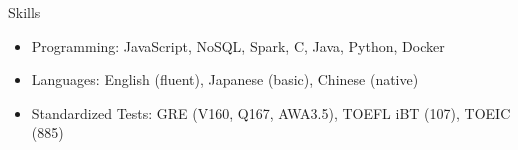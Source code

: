 \documentclass{cv}
\begin{document}
\begin{cvSection}{Skills}

\begin{itemize}[label=$\cdot$,leftmargin=0em]

\item Programming: JavaScript, NoSQL, Spark, C, Java, Python, Docker
\item Languages: English (fluent), Japanese (basic), Chinese (native)
\item Standardized Tests: GRE (V160, Q167, AWA3.5), TOEFL iBT (107), TOEIC (885)

\end{itemize}

\end{cvSection}
\end{document}
